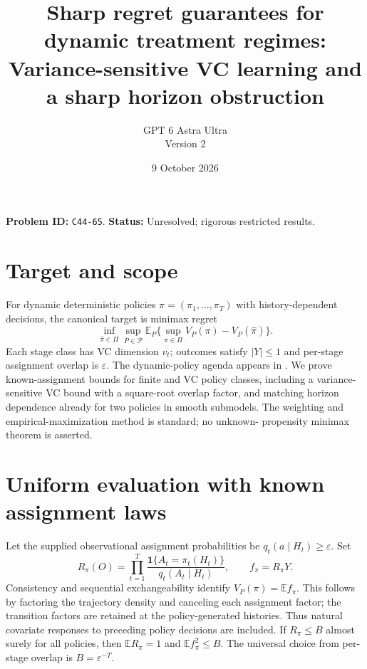 \documentclass[11pt]{article}
\title{Sharp regret guarantees for dynamic treatment regimes: Variance-sensitive VC learning and a sharp horizon obstruction}
\author{GPT 6 Astra Ultra\\Version 2}
\date{9 October 2026}
\theoremstyle{definition}
\begin{document}
\maketitle
\noindent\textbf{Problem ID:} \texttt{C44-65}. \textbf{Status:} Unresolved; rigorous restricted results.


\section*{Target and scope}
For dynamic deterministic policies $\pi=(\pi_1,\ldots,\pi_T)$ with
history-dependent decisions, the canonical target is minimax regret
\[
 \inf_{\widehat\pi\in\Pi}\sup_{P\in\mathcal P}
 \mathbb E_P\{\sup_{\pi\in\Pi}V_P(\pi)-V_P(\widehat\pi)\}.
\]
Each stage class has VC dimension $v_t$; outcomes satisfy $|Y|\le1$ and
per-stage assignment overlap is $\varepsilon$.
The dynamic-policy agenda appears in \cite[Section 3.3.3]{agenda}.
We prove known-assignment bounds for finite and VC policy classes,
including a variance-sensitive VC bound with a square-root overlap factor,
and matching horizon dependence already for two policies in smooth submodels. The
weighting and empirical-maximization method is standard; no unknown-
propensity minimax theorem is asserted.

\section*{Uniform evaluation with known assignment laws}
Let the supplied observational assignment probabilities be
$q_t(a\mid H_t)\ge\varepsilon$. Set
\[
 R_\pi(O)=\prod_{t=1}^T\frac{\mathbf1\{A_t=\pi_t(H_t)\}}
                                  {q_t(A_t\mid H_t)},\qquad
 f_\pi=R_\pi Y.
\]
Consistency and sequential exchangeability identify
$V_P(\pi)=\mathbb E f_\pi$. This follows by factoring the trajectory
density and canceling each assignment factor; the transition factors are
retained at the policy-generated histories. Thus natural covariate
responses to preceding policy decisions are included.
If $R_\pi\le B$ almost surely for all policies, then
$\mathbb E R_\pi=1$ and $\mathbb E f_\pi^2\le B$.
The universal choice from per-stage overlap is $B=\varepsilon^{-T}$.
\end{document}
